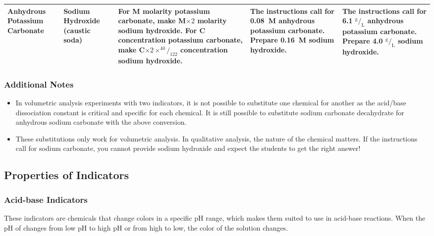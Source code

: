 \begin{landscape}
\begin{table}
\begin{tabular}{| p{3.5cm} | p{4cm} | p{8cm} | p{4cm} | p{4cm} |}
Anhydrous Potassium Carbonate & 
Sodium Hydroxide (caustic soda) & 
For M molarity potassium carbonate, make M$\times 2$ molarity sodium hydroxide. For C concentration potassium carbonate, make C$\times 2 \times ^{40}/_{122}$ concentration sodium hydroxide. & 
The instructions call for 0.08~M anhydrous potassium carbonate. Prepare 0.16~M sodium hydroxide. & 
The instructions call for 6.1 $^\text{g}/_\text{L}$ anhydrous potassium carbonate. Prepare 4.0 $^\text{g}/_\text{L}$ sodium hydroxide. \\ \hline

\end{tabular}

\end{table}
\end{landscape}
\restoregeometry

\subsubsection{Additional Notes}

\begin{itemize}

\item{In volumetric analysis experiments with two indicators, it is not possible to substitute one chemical for another as the acid/base dissociation constant is critical and specific for each chemical. It is still possible to substitute sodium carbonate decahydrate for anhydrous sodium carbonate with the above conversion.}

\item{These substitutions only work for volumetric analysis. In qualitative analysis, the nature of the chemical matters. If the instructions call for sodium carbonate, you cannot provide sodium hydroxide and expect the students to get the right answer!}

\end{itemize}

\subsection{Properties of Indicators} 

\subsubsection{Acid-base Indicators}\label{sss:acid-baseind}
These indicators are chemicals that change colors in a specific pH range, which makes them suited to use in acid-base reactions. When the pH of changes from low pH to high pH or from high to low, the color of the solution changes. 

